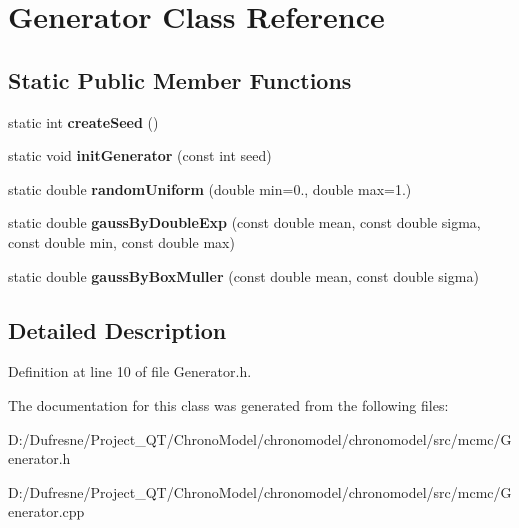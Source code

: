 \hypertarget{class_generator}{\section{Generator Class Reference}
\label{class_generator}
}
\subsection*{Static Public Member Functions}
\begin{DoxyCompactItemize}
\item 
\hypertarget{class_generator_a30c6e7233062db8e02db18995e60f41e}{static int {\bfseries create\-Seed} ()}\label{class_generator_a30c6e7233062db8e02db18995e60f41e}

\item 
\hypertarget{class_generator_a7a2f9cbc87f2a99f97fe6e5e28c48ffc}{static void {\bfseries init\-Generator} (const int seed)}\label{class_generator_a7a2f9cbc87f2a99f97fe6e5e28c48ffc}

\item 
\hypertarget{class_generator_a72bde32fd47d4cdfb8662c333a06e597}{static double {\bfseries random\-Uniform} (double min=0., double max=1.)}\label{class_generator_a72bde32fd47d4cdfb8662c333a06e597}

\item 
\hypertarget{class_generator_a6a0fcf26a218408c49c17d2b0b13e050}{static double {\bfseries gauss\-By\-Double\-Exp} (const double mean, const double sigma, const double min, const double max)}\label{class_generator_a6a0fcf26a218408c49c17d2b0b13e050}

\item 
\hypertarget{class_generator_ad745d148883d02f51f00a04a54c145df}{static double {\bfseries gauss\-By\-Box\-Muller} (const double mean, const double sigma)}\label{class_generator_ad745d148883d02f51f00a04a54c145df}

\end{DoxyCompactItemize}


\subsection{Detailed Description}


Definition at line 10 of file Generator.\-h.



The documentation for this class was generated from the following files\-:\begin{DoxyCompactItemize}
\item 
D\-:/\-Dufresne/\-Project\-\_\-\-Q\-T/\-Chrono\-Model/chronomodel/chronomodel/src/mcmc/Generator.\-h\item 
D\-:/\-Dufresne/\-Project\-\_\-\-Q\-T/\-Chrono\-Model/chronomodel/chronomodel/src/mcmc/Generator.\-cpp\end{DoxyCompactItemize}
